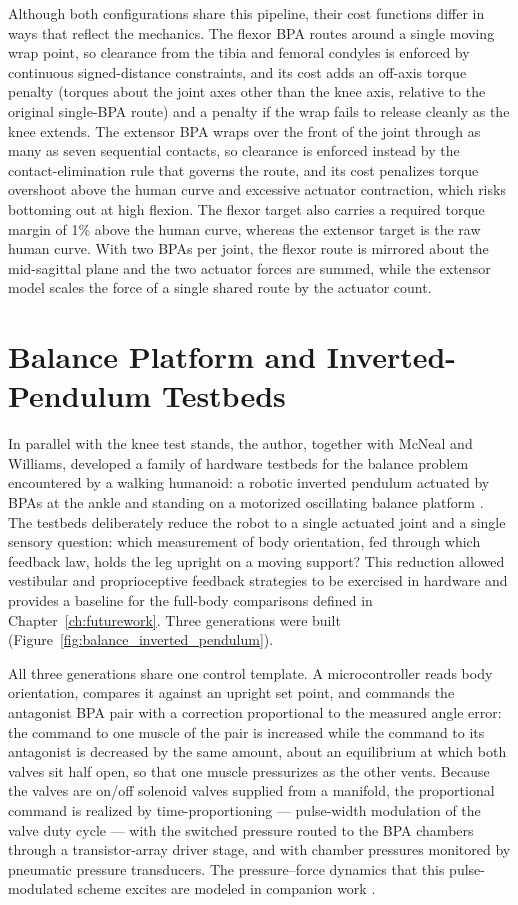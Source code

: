 Although both configurations share this pipeline, their cost functions differ in ways that reflect the mechanics. The flexor BPA routes around a single moving wrap point, so clearance from the tibia and femoral condyles is enforced by continuous signed-distance constraints, and its cost adds an off-axis torque penalty (torques about the joint axes other than the knee axis, relative to the original single-BPA route) and a penalty if the wrap fails to release cleanly as the knee extends. The extensor BPA wraps over the front of the joint through as many as seven sequential contacts, so clearance is enforced instead by the contact-elimination rule that governs the route, and its cost penalizes torque overshoot above the human curve and excessive actuator contraction, which risks bottoming out at high flexion. The flexor target also carries a required torque margin of 1\% above the human curve, whereas the extensor target is the raw human curve. With two BPAs per joint, the flexor route is mirrored about the mid-sagittal plane and the two actuator forces are summed, while the extensor model scales the force of a single shared route by the actuator count.

\section{Balance Platform and Inverted-Pendulum Testbeds}\label{sec:balance_testbeds}

In parallel with the knee test stands, the author, together with McNeal and Williams, developed a family of hardware testbeds for the balance problem encountered by a walking humanoid: a robotic inverted pendulum actuated by BPAs at the ankle and standing on a motorized oscillating balance platform \citep{bolen_balance_2024, bolen_selfbalancing_2024, bolen_selfbalancing_srs_2024}. The testbeds deliberately reduce the robot to a single actuated joint and a single sensory question: which measurement of body orientation, fed through which feedback law, holds the leg upright on a moving support? This reduction allowed vestibular and proprioceptive feedback strategies to be exercised in hardware and provides a baseline for the full-body comparisons defined in Chapter~\ref{ch:futurework}. Three generations were built (Figure~\ref{fig:balance_inverted_pendulum}).

All three generations share one control template. A microcontroller reads body orientation, compares it against an upright set point, and commands the antagonist BPA pair with a correction proportional to the measured angle error: the command to one muscle of the pair is increased while the command to its antagonist is decreased by the same amount, about an equilibrium at which both valves sit half open, so that one muscle pressurizes as the other vents. Because the valves are on/off solenoid valves supplied from a manifold, the proportional command is realized by time-proportioning --- pulse-width modulation of the valve duty cycle --- with the switched pressure routed to the BPA chambers through a transistor-array driver stage, and with chamber pressures monitored by pneumatic pressure transducers. The pressure--force dynamics that this pulse-modulated scheme excites are modeled in companion work \citep{elzein_pressure_2025}.

